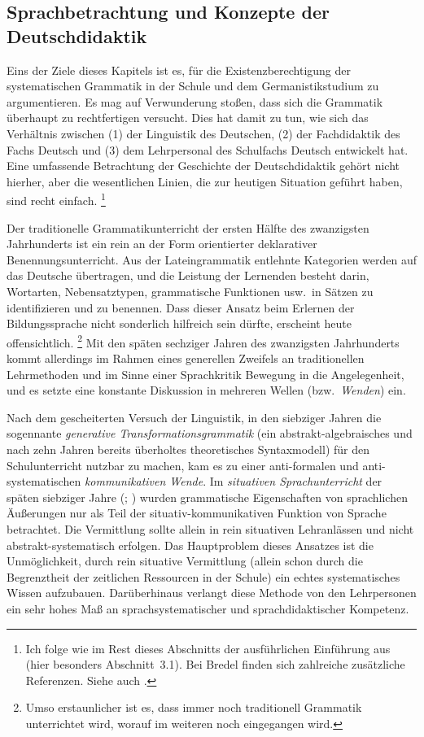 \subsection{Sprachbetrachtung und Konzepte der Deutschdidaktik}
\label{sec:sprachbetrachtungundkonzeptederdeutschdidaktik}

Eins der Ziele dieses Kapitels ist es, für die Existenzberechtigung der systematischen Grammatik in der Schule und dem Germanistikstudium zu argumentieren.
Es mag auf Verwunderung stoßen, dass sich die Grammatik überhaupt zu rechtfertigen versucht.
Dies hat damit zu tun, wie sich das Verhältnis zwischen (1) der Linguistik des Deutschen, (2) der Fachdidaktik des Fachs Deutsch und (3) dem Lehrpersonal des Schulfachs Deutsch entwickelt hat.
Eine umfassende Betrachtung der Geschichte der Deutschdidaktik gehört nicht hierher, aber die wesentlichen Linien, die zur heutigen Situation geführt haben, sind recht einfach.%
\footnote{Ich folge wie im Rest dieses Abschnitts der ausführlichen Einführung aus \citet{Bredel2013} (hier besonders Abschnitt~3.1).
Bei Bredel finden sich zahlreiche zusätzliche Referenzen.
Siehe auch \citet{Gornik2003}.}

Der {traditionelle Grammatikunterricht} der ersten Hälfte des zwanzigsten Jahrhunderts ist ein rein an der Form orientierter deklarativer Benennungsunterricht.
Aus der Lateingrammatik entlehnte Kategorien werden auf das Deutsche übertragen, und die Leistung der Lernenden besteht darin, Wortarten, Nebensatztypen, grammatische Funktionen usw.\ in Sätzen zu identifizieren und zu benennen.
Dass dieser Ansatz beim Erlernen der Bildungssprache nicht sonderlich hilfreich sein dürfte, erscheint heute offensichtlich.%
\footnote{Umso erstaunlicher ist es, dass immer noch traditionell Grammatik unterrichtet wird, worauf im weiteren noch eingegangen wird.}
Mit den späten sechziger Jahren des zwanzigsten Jahrhunderts kommt allerdings im Rahmen eines generellen Zweifels an traditionellen Lehrmethoden und im Sinne einer Sprachkritik Bewegung in die Angelegenheit, und es setzte eine konstante Diskussion in mehreren Wellen (bzw.\ \textit{Wenden}) ein.

Nach dem gescheiterten Versuch der Linguistik, in den siebziger Jahren die sogennante \textit{generative Transformationsgrammatik} (ein abstrakt-algebraisches und nach zehn Jahren bereits überholtes theoretisches Syntaxmodell) für den Schulunterricht nutzbar zu machen, kam es zu einer anti-formalen und anti-systematischen \textit{kommunikativen Wende}.
Im \textit{situativen Sprachunterricht} der späten siebziger Jahre (\citealt[229--232]{Bredel2013}; \citealt{BoettcherSitta1978}) wurden grammatische Eigenschaften von sprachlichen Äußerungen nur als Teil der situativ-kommunikativen Funktion von Sprache betrachtet.
Die Vermittlung sollte allein in rein situativen Lehranlässen und nicht abstrakt-systematisch erfolgen.
Das Hauptproblem dieses Ansatzes ist die Unmöglichkeit, durch rein situative Vermittlung (allein schon durch die Begrenztheit der zeitlichen Ressourcen in der Schule) ein echtes systematisches Wissen aufzubauen.
Darüberhinaus verlangt diese Methode von den Lehrpersonen ein sehr hohes Maß an sprachsystematischer und sprachdidaktischer Kompetenz.

